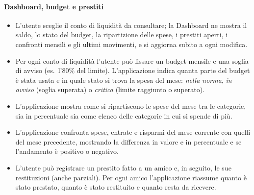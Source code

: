 \documentclass[11pt,a4paper,openright]{report}
\begin{document}
\paragraph{Dashboard, budget e prestiti}
\begin{itemize}
  \item L'utente sceglie il conto di liquidità da consultare; la Dashboard ne mostra il saldo, lo stato
  del budget, la ripartizione delle spese, i prestiti aperti, i confronti mensili e gli ultimi
  movimenti, e si aggiorna subito a ogni modifica.
  \item Per ogni conto di liquidità l'utente può fissare un budget mensile e una soglia di avviso
  (es.\ l'80\% del limite). L'applicazione indica quanta parte del budget è stata usata e in quale stato
  si trova la spesa del mese: \emph{nella norma}, \emph{in avviso} (soglia superata) o \emph{critica}
  (limite raggiunto o superato).
  \item L'applicazione mostra come si ripartiscono le spese del mese tra le categorie, sia in percentuale
  sia come elenco delle categorie in cui si spende di più.
  \item L'applicazione confronta spese, entrate e risparmi del mese corrente con quelli del mese
  precedente, mostrando la differenza in valore e in percentuale e se l'andamento è positivo o negativo.
  \item L'utente può registrare un prestito fatto a un amico e, in seguito, le sue restituzioni (anche
  parziali). Per ogni amico l'applicazione riassume quanto è stato prestato, quanto è stato restituito e
  quanto resta da ricevere.
\end{itemize}
\end{document}
